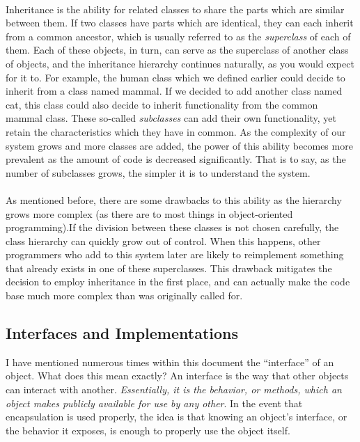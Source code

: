\documentclass{article}
\begin{document}
\paragraph{}
Inheritance is the ability for related classes to share the parts which are
similar between them. If two classes have parts which are identical, they can
each inherit from a common ancestor, which is usually referred to as the
\textit{superclass} of each of them. Each of these objects, in turn, can serve
as the
superclass of another class of objects, and the inheritance hierarchy continues
naturally, as you would expect for it to. For example, the human class which we
defined earlier could decide to inherit from a class named mammal. If we decided
to add another class named cat, this class could also decide to inherit
functionality from the common mammal class. These so-called \textit{subclasses}
can add
their own functionality, yet retain the characteristics which they have in
common. As the complexity of our system grows and more classes are added, the
power of this ability becomes more prevalent as the amount of code is decreased
significantly. That is to say, as the number of subclasses grows, the simpler
it is to understand the system.
\paragraph{}
As mentioned before, there are some drawbacks to this ability as the hierarchy
grows more complex (as there are to most things in object-oriented
programming).If the division between these classes is not chosen carefully, the
class
hierarchy can quickly grow out of control. When this happens, other programmers
who add to this system later are likely to reimplement something that already
exists in one of these superclasses. This drawback mitigates the decision to
employ inheritance in the first place, and can actually make the code base much
more complex than was originally called for.

\subsection{Interfaces and Implementations}
I have mentioned numerous times within this document the “interface” of an
object. What does this mean exactly? An interface is the way that other objects
can interact with another. \textit{Essentially, it is the behavior, or methods,
which an
object makes publicly available for use by any other}. In the event that
encapsulation is used properly, the idea is that knowing an object’s interface,
or the behavior it exposes, is enough to properly use the object itself.
\end{document}
